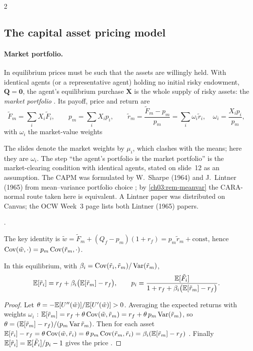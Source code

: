 \begin{paracol}{2}
\subsection{The capital asset pricing model}
\paragraph{Market portfolio.} In equilibrium prices must be such that the assets are willingly held. With
identical agents (or a representative agent) holding no initial risky endowment, $\bm Q=\bm0$, the agent's
equilibrium purchase $\bm X$ is the whole supply of risky assets: the \emph{market portfolio}
. Its payoff, price and return are
\[
  \tilde F_m=\sum_iX_i\tilde F_i,\qquad p_m=\sum_iX_ip_i,\qquad
  \tilde r_m=\frac{\tilde F_m-p_m}{p_m}=\sum_i\omega_i\tilde r_i,\quad \omega_i=\frac{X_ip_i}{p_m},
\]
with $\omega_i$ the market-value weights \begin{coursenote}
The slides denote the market weights by $\mu_i$, which clashes with the means; here they are $\omega_i$. The step
``the agent's portfolio is the market portfolio'' is the market-clearing condition with identical agents,
stated on slide~12 as an assumption. The CAPM was formulated by W.~Sharpe (1964) and J.~Lintner (1965) from
mean--variance portfolio choice ; by \cref{ch03:rem-meanvar} the CARA-normal route taken here is
equivalent. A Lintner paper was distributed on Canvas; the OCW Week~3 page lists both Lintner (1965) papers.
\end{coursenote}.

The key identity is
$\tilde w=\tilde F_m+(Q_f-p_m)(1+r_f)=p_m\tilde r_m+\text{const}$, hence $\operatorname{Cov}(\tilde w,\cdot)=p_m\operatorname{Cov}(\tilde r_m,\cdot)$.

\begin{theorem}\label{ch03:thm-capm}
In this equilibrium, with $\beta_i=\operatorname{Cov}(\tilde r_i,\tilde r_m)/\operatorname{Var}(\tilde r_m)$,
\[
  \mathbb{E}[\tilde r_i]=r_f+\beta_i\bigl(\mathbb{E}[\tilde r_m]-r_f\bigr),\qquad
  p_i=\frac{\mathbb{E}[\tilde F_i]}{1+r_f+\beta_i\bigl(\mathbb{E}[\tilde r_m]-r_f\bigr)} .
\]
\end{theorem}
\begin{proof}
Let $\theta=-\mathbb{E}[U''(\tilde w)]/\mathbb{E}[U'(\tilde w)]>0$. Averaging the expected returns with weights $\omega_i$
: $\mathbb{E}[\tilde r_m]=r_f+\theta\operatorname{Cov}(\tilde w,\tilde r_m)=r_f+\theta\,p_m\operatorname{Var}(\tilde r_m)$, so
$\theta=(\mathbb{E}[\tilde r_m]-r_f)/(p_m\operatorname{Var}\tilde r_m)$. Then for each asset
$\mathbb{E}[\tilde r_i]-r_f=\theta\operatorname{Cov}(\tilde w,\tilde r_i)=\theta\,p_m\operatorname{Cov}(\tilde r_m,\tilde r_i)=\beta_i(\mathbb{E}[\tilde r_m]-r_f)$ . Finally
$\mathbb{E}[\tilde r_i]=\mathbb{E}[\tilde F_i]/p_i-1$ gives the price .
\end{proof}


\end{paracol}
